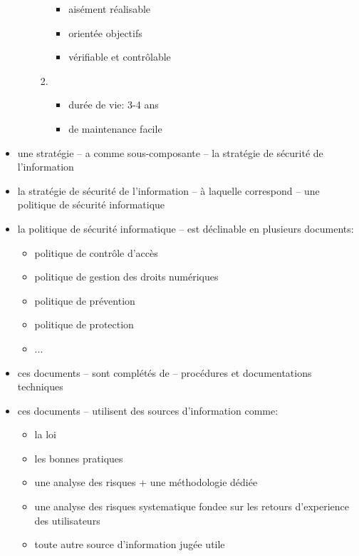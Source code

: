 \documentclass[a4paper]{article}
\begin{document}
\begin{itemize}
\begin{itemize}
\begin{enumerate}
            \begin{itemize}
                \item aisément réalisable
                \item orientée objectifs
                \item vérifiable et contrôlable
            \end{itemize}
            \item 
            \begin{itemize}
                \item durée de vie: 3-4 ans
                \item de maintenance facile
            \end{itemize}
        \end{enumerate}
    \end{itemize}
    \item une stratégie -- a comme sous-composante -- la stratégie de sécurité de l'information
    \item la stratégie de sécurité de l'information -- à laquelle correspond -- une politique de sécurité informatique
    \item la politique de sécurité informatique -- est déclinable en plusieurs documents:
    \begin{itemize}
        \item politique de contrôle d’accès
        \item politique de gestion des droits numériques
        \item politique de prévention
        \item politique de protection
        \item ...
    \end{itemize}
    \item ces documents -- sont complétés de -- procédures et documentations techniques
    \item ces documents -- utilisent des sources d'information comme:
    \begin{itemize}
        \item la loi
        \item les bonnes pratiques
        \item une analyse des risques + une méthodologie dédiée
        \item une analyse des risques systematique fondee sur les retours d’experience des utilisateurs
        \item toute autre source d’information jugée utile
    \end{itemize}
\end{itemize}
\end{document}
